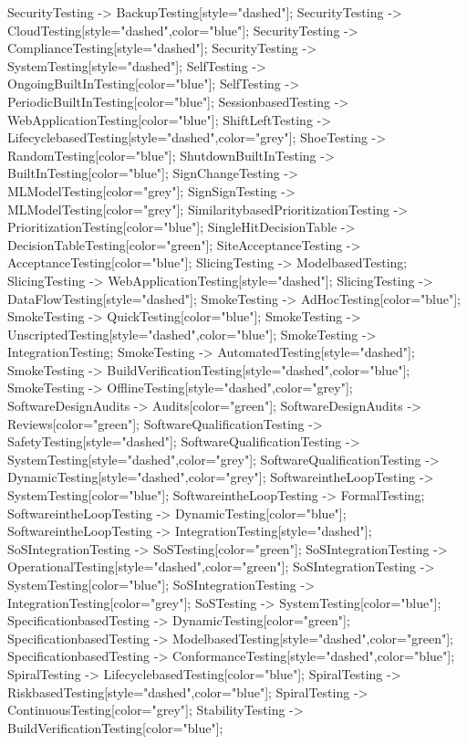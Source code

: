 \documentclass{article}
\begin{document}
{SecurityTesting -> BackupTesting[style="dashed"];
SecurityTesting -> CloudTesting[style="dashed",color="blue"];
SecurityTesting -> ComplianceTesting[style="dashed"];
SecurityTesting -> SystemTesting[style="dashed"];
SelfTesting -> OngoingBuiltInTesting[color="blue"];
SelfTesting -> PeriodicBuiltInTesting[color="blue"];
SessionbasedTesting -> WebApplicationTesting[color="blue"];
ShiftLeftTesting -> LifecyclebasedTesting[style="dashed",color="grey"];
ShoeTesting -> RandomTesting[color="blue"];
ShutdownBuiltInTesting -> BuiltInTesting[color="blue"];
SignChangeTesting -> MLModelTesting[color="grey"];
SignSignTesting -> MLModelTesting[color="grey"];
SimilaritybasedPrioritizationTesting -> PrioritizationTesting[color="blue"];
SingleHitDecisionTable -> DecisionTableTesting[color="green"];
SiteAcceptanceTesting -> AcceptanceTesting[color="blue"];
SlicingTesting -> ModelbasedTesting;
SlicingTesting -> WebApplicationTesting[style="dashed"];
SlicingTesting -> DataFlowTesting[style="dashed"];
SmokeTesting -> AdHocTesting[color="blue"];
SmokeTesting -> QuickTesting[color="blue"];
SmokeTesting -> UnscriptedTesting[style="dashed",color="blue"];
SmokeTesting -> IntegrationTesting;
SmokeTesting -> AutomatedTesting[style="dashed"];
SmokeTesting -> BuildVerificationTesting[style="dashed",color="blue"];
SmokeTesting -> OfflineTesting[style="dashed",color="grey"];
SoftwareDesignAudits -> Audits[color="green"];
SoftwareDesignAudits -> Reviews[color="green"];
SoftwareQualificationTesting -> SafetyTesting[style="dashed"];
SoftwareQualificationTesting -> SystemTesting[style="dashed",color="grey"];
SoftwareQualificationTesting -> DynamicTesting[style="dashed",color="grey"];
SoftwareintheLoopTesting -> SystemTesting[color="blue"];
SoftwareintheLoopTesting -> FormalTesting;
SoftwareintheLoopTesting -> DynamicTesting[color="blue"];
SoftwareintheLoopTesting -> IntegrationTesting[style="dashed"];
SoSIntegrationTesting -> SoSTesting[color="green"];
SoSIntegrationTesting -> OperationalTesting[style="dashed",color="green"];
SoSIntegrationTesting -> SystemTesting[color="blue"];
SoSIntegrationTesting -> IntegrationTesting[color="grey"];
SoSTesting -> SystemTesting[color="blue"];
SpecificationbasedTesting -> DynamicTesting[color="green"];
SpecificationbasedTesting -> ModelbasedTesting[style="dashed",color="green"];
SpecificationbasedTesting -> ConformanceTesting[style="dashed",color="blue"];
SpiralTesting -> LifecyclebasedTesting[color="blue"];
SpiralTesting -> RiskbasedTesting[style="dashed",color="blue"];
SpiralTesting -> ContinuousTesting[color="grey"];
StabilityTesting -> BuildVerificationTesting[color="blue"];
}
\end{document}
